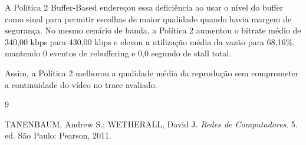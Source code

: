 \documentclass[
    12pt,
    a4paper,
    oneside
]{article}
\begin{document}
A Política 2 Buffer-Based endereçou essa deficiência ao usar o nível do buffer como sinal para permitir escolhas de maior qualidade quando havia margem de segurança. No mesmo cenário de banda, a Política 2 aumentou o bitrate médio de 340,00 kbps para 430,00 kbps e elevou a utilização média da vazão para 68,16\%, mantendo 0 eventos de rebuffering e 0,0 segundo de stall total.

Assim, a Política 2 melhorou a qualidade média da reprodução sem comprometer a continuidade do vídeo no trace avaliado.


\begin{thebibliography}{9}

TANENBAUM, Andrew S.;
WETHERALL, David J.
\textit{Redes de Computadores}.
5. ed.
São Paulo: Pearson, 2011.

\end{thebibliography}
\end{document}
